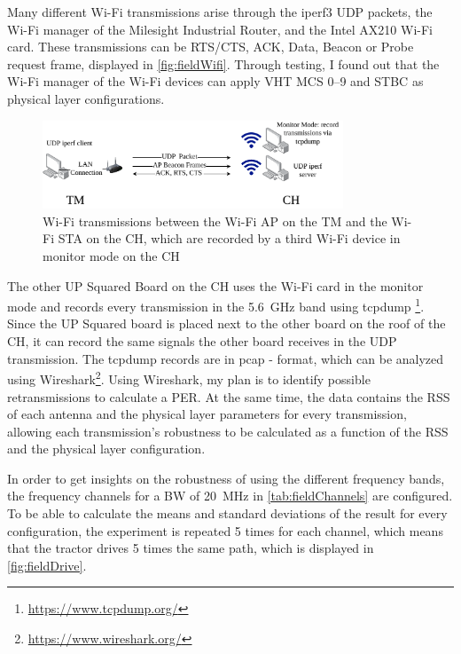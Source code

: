 Many different Wi-Fi transmissions arise through the iperf3 \ac{UDP} packets, the Wi-Fi manager of the Milesight Industrial Router, and the Intel AX210 Wi-Fi card.
These transmissions can be RTS/CTS, ACK, Data, Beacon or Probe request frame, displayed in \autoref{fig:fieldWifi}.
Through testing, I found out that the Wi-Fi manager of the Wi-Fi devices can apply \ac{VHT} \ac{MCS} \numrange{0}{9} and \ac{STBC} as physical layer configurations.

\begin{figure}[H]%
	\centering
	\includegraphics[width=0.8\textwidth]{figures/FieldExperimentwifi}
	\caption{Wi-Fi transmissions between the Wi-Fi \ac{AP} on the \acf{TM} and the Wi-Fi \ac{STA} on the \acf{CH}, which
	are recorded by a third Wi-Fi device in monitor mode on the \ac{CH}}
	\label{fig:fieldWifi}%
\end{figure}

The other UP Squared Board on the \ac{CH} uses the Wi-Fi card in the monitor mode and records every transmission in the \SI{5.6}{\giga\hertz} band using tcpdump \footnote{\url{https://www.tcpdump.org/}}.
Since the UP Squared board is placed next to the other board on the roof of the \ac{CH}, it can record the same signals the other board receives in the \ac{UDP} transmission.
The tcpdump records are in pcap - format, which can be analyzed using Wireshark\footnote{\url{https://www.wireshark.org/}}.
Using Wireshark, my plan is to identify possible retransmissions to calculate a \ac{PER}.
At the same time, the data contains the \ac{RSS} of each antenna and the physical layer parameters for every
transmission, allowing each transmission's robustness to be calculated as a function of the \ac{RSS} and the physical
layer configuration.

In order to get insights on the robustness of using the different frequency bands, the frequency channels for a \ac{BW} of \SI{20}{\mega\hertz} in \autoref{tab:fieldChannels} are configured.
To be able to calculate the means and standard deviations of the result for every configuration, the experiment is repeated \num{5} times for each channel,
which means that the tractor drives \num{5} times the same path, which is displayed in \autoref{fig:fieldDrive}.

